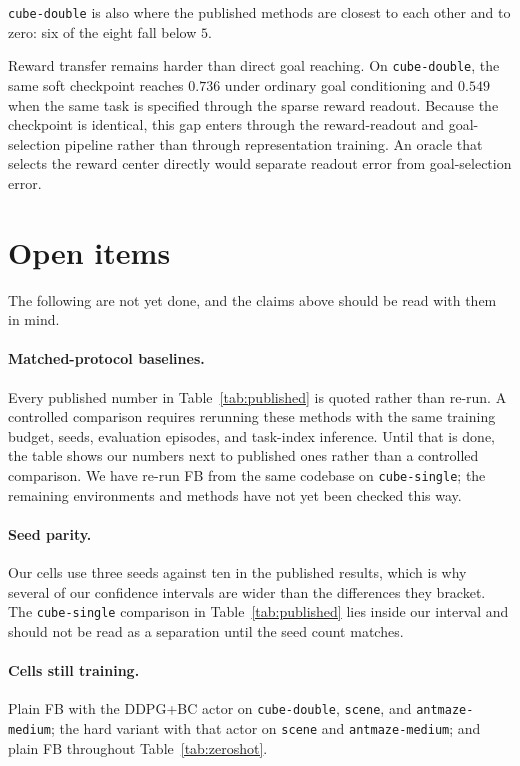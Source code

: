 \documentclass{article}
\begin{document}
\texttt{cube-double} is also where the published methods are closest to each other and to zero: six of the eight fall below $5$.

Reward transfer remains harder than direct goal reaching.
On \texttt{cube-double}, the same soft checkpoint reaches $0.736$ under ordinary goal conditioning and $0.549$ when the same task is specified through the sparse reward readout.
Because the checkpoint is identical, this gap enters through the reward-readout and goal-selection pipeline rather than through representation training.
An oracle that selects the reward center directly would separate readout error from goal-selection error.

\section{Open items}
\label{sec:todo}

The following are not yet done, and the claims above should be read with them in mind.

\paragraph{Matched-protocol baselines.}
Every published number in Table~\ref{tab:published} is quoted rather than re-run.
A controlled comparison requires rerunning these methods with the same training budget, seeds, evaluation episodes, and task-index inference.
Until that is done, the table shows our numbers next to published ones rather than a controlled comparison.
We have re-run FB from the same codebase on \texttt{cube-single}; the remaining environments and methods have not yet been checked this way.

\paragraph{Seed parity.}
Our cells use three seeds against ten in the published results, which is why several of our confidence intervals are wider than the differences they bracket.
The \texttt{cube-single} comparison in Table~\ref{tab:published} lies inside our interval and should not be read as a separation until the seed count matches.

\paragraph{Cells still training.}
Plain FB with the DDPG+BC actor on \texttt{cube-double}, \texttt{scene}, and \texttt{antmaze-medium};
the hard variant with that actor on \texttt{scene} and \texttt{antmaze-medium};
and plain FB throughout Table~\ref{tab:zeroshot}.
\end{document}
